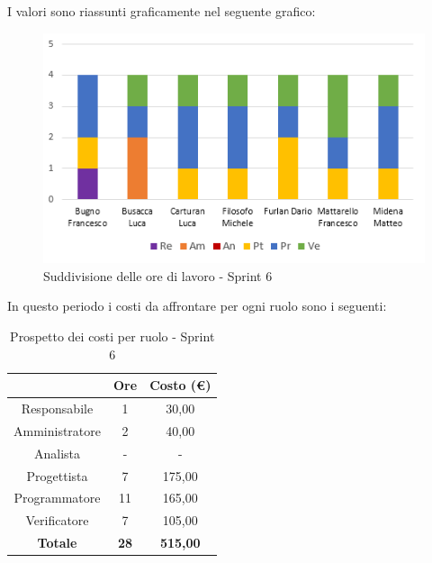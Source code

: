 I valori sono riassunti graficamente nel seguente grafico:

\begin{figure}[H]
  \centering
  \includegraphics[scale=1.0]{immagini/6Sprint_oreLavoro.png}
  \caption{Suddivisione delle ore di lavoro - Sprint 6}
\end{figure}

\pagebreak
In questo periodo i costi da affrontare per ogni ruolo sono i seguenti:

\begin{table}[H]
  \centering
  \renewcommand{\arraystretch}{1.8}
  \begin{tabular}{c|c|c}
    \rowcolor[HTML]{125E28}
    \multicolumn{1}{c}{\color[HTML]{FFFFFF}\textbf{Ruolo}}
                    & \multicolumn{1}{c}{\color[HTML]{FFFFFF}\textbf{Ore}}
                    & \multicolumn{1}{c}{\color[HTML]{FFFFFF}\textbf{Costo (€)}}                   \\
    \hline
    Responsabile    & 1                                                          & 30,00           \\
    Amministratore  & 2                                                          & 40,00           \\
    Analista        & -                                                          & -               \\
    Progettista     & 7                                                          & 175,00          \\
    Programmatore   & 11                                                         & 165,00          \\
    Verificatore    & 7                                                          & 105,00          \\
    \textbf{Totale} & \textbf{28}                                                & \textbf{515,00}
  \end{tabular}
  \caption{Prospetto dei costi per ruolo - Sprint 6}
\end{table}

